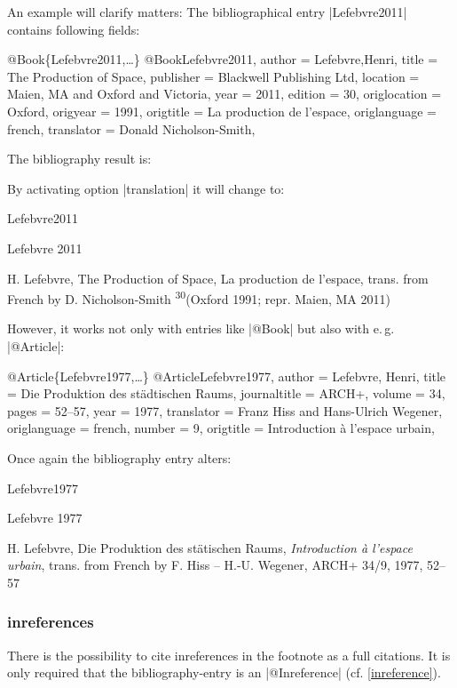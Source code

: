 \documentclass[a4paper,
10pt,
greek,
french,
spanish,
italian,
ngerman,
english
]{ltxdoc}
\begin{document}
An example will clarify matters:
The bibliographical entry |Lefebvre2011| contains following fields:
\begin{bibexample}[label=Lefebvre2011]{{@}Book\{Lefebvre2011,…\}}
@Book{Lefebvre2011,
  author       = {Lefebvre,Henri},
  title        = {The Production of Space},
  publisher    = {Blackwell Publishing Ltd},
  location     = {Maien, MA and Oxford and Victoria},
  year         = {2011},
  edition      = {30},
  origlocation = {Oxford},
  origyear     = {1991},
  origtitle    = {La production de l’espace},
  origlanguage = {french},
  translator   = {Donald Nicholson-Smith},
}
\end{bibexample}

The bibliography result is:

By activating option |translation| it will change to:

\begin{bibbox}{Lefebvre2011}\footnotesize
\parbox[t]{2cm}{Lefebvre 2011} \parbox[t]{9cm}{H. Lefebvre,  The Production of Space, 
{\color{red} La production de l’espace, trans. from French by D. Nicholson-Smith} \textsuperscript{30}(Oxford 1991; repr. Maien, MA 2011)}
\end{bibbox}
 
However, it works not only with entries like |@Book| but also with e.\,g. |@Article|:

\begin{bibexample}[label=Lefebvre1977]{{@}Article\{Lefebvre1977,…\}}
@Article{Lefebvre1977,
  author       = {Lefebvre, Henri},
  title        = {Die Produktion des städtischen Raums},
  journaltitle = {ARCH+},
  volume       = {34},
  pages        = {52--57},
  year         = {1977},
  translator   = {Franz Hiss and Hans-Ulrich Wegener},
  origlanguage = {french},
  number       = {9},
  origtitle    = {Introduction à l'espace urbain},
}
\end{bibexample}

Once again the bibliography entry alters:

\begin{bibbox}{Lefebvre1977}\footnotesize
\parbox[t]{2cm}{Lefebvre 1977} \parbox[t]{9cm}{H. Lefebvre, 
Die Produktion des stätischen Raums, \emph{Introduction à l’espace urbain}, 
{\color{red} trans. from French by F. Hiss -- H.-U. Wegener}, ARCH+ 34/9, 1977, 52–57}
\end{bibbox}

\subsubsection{inreferences}\label{inreferences}
There is the possibility to cite inreferences in the footnote as a full citations.
It is only required that the bibliography-entry is an |@Inreference|  (cf. \cref{inreference}).
 
\end{document}
